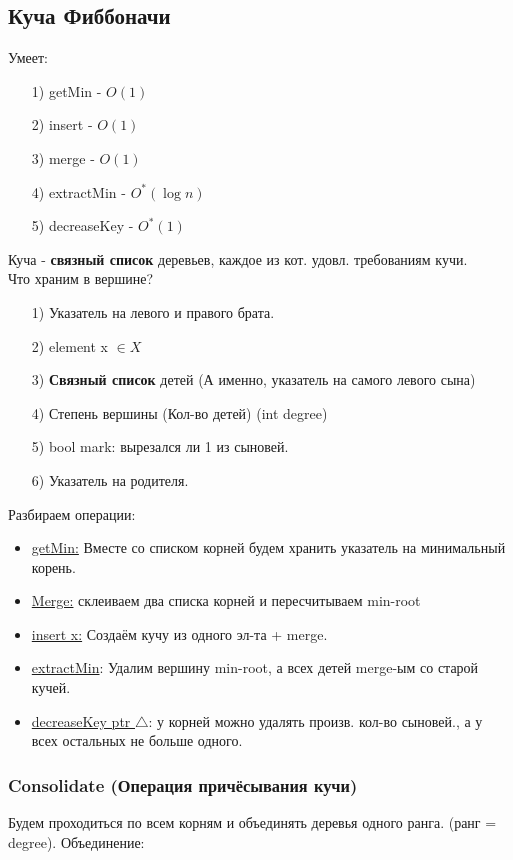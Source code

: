 \subsection{Куча Фиббоначи}
Умеет:
\begin{itemize}
  \item [1)] getMin - $O(1)$
  \item [2) ] insert - $O(1)$ 
  \item [3) ] merge - $O(1)$
  \item [4) ] extractMin - $O^{*}(\log n)$
  \item [5) ] decreaseKey - $O^{*}(1)$
  \item []
\end{itemize}
Куча - \textbf{связный список} деревьев, каждое из кот. удовл. требованиям кучи. \\

Что храним в вершине?
\begin{itemize}
  \item [1) ] Указатель на левого и правого брата.
  \item [2) ] element x $\in X$
  \item [3) ] \textbf{Связный список} детей (А именно, указатель на самого левого сына) 
  \item [4) ] Степень вершины (Кол-во детей) (int degree)
  \item [5) ] bool mark: вырезался ли 1 из сыновей.
  \item [6) ] Указатель на родителя.
\end{itemize}
Разбираем операции:
\begin{itemize}
  \item \underline{getMin:} Вместе со списком корней будем хранить указатель на минимальный корень.
  \item \underline{Merge:} склеиваем два списка корней и пересчитываем min-root
  \item \underline{insert x:} Создаём кучу из одного эл-та + merge.
  \item \underline{extractMin}: Удалим вершину min-root, а всех детей merge-ым со старой кучей.
  \item \underline{decreaseKey ptr $\triangle$}: у корней можно удалять произв. кол-во сыновей., а у всех остальных не больше одного.
\end{itemize}
\subsubsection{Consolidate (Операция причёсывания кучи)}
Будем проходиться по всем корням и объединять деревья одного ранга. (ранг = degree). Объединение: \\


